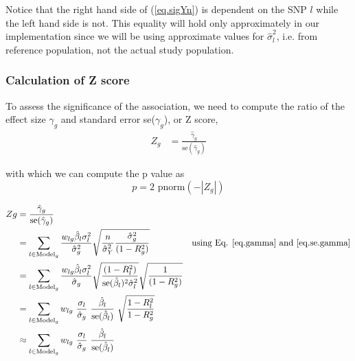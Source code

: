 \documentclass[10pt]{article}
\begin{document}
Notice that the right hand side of (\ref{eq.sigYn}) is dependent on the SNP $l$ while the left hand side is not. This equality will hold only approximately in our implementation since we will be using approximate values for $\hat\sigma_l^2$, i.e. from reference population, not the actual study population.

\subsubsection*{Calculation of Z score}

To assess the significance of the association, we need to compute the ratio of the effect size $\gamma_g$ and standard error se($\gamma_g$), or Z score, 
\begin{align}
Z_g & = \frac{ \hat\gamma_g}{\text{se}(\hat\gamma_g)} 
\end{align}

with which we can compute the  p value as
\begin{equation}
p = 2 \text{ pnorm}(-|Z_g|)
\end{equation}

\begin{align}
Zg 
& = \frac{ \hat\gamma_g}{\text{se}(\hat\gamma_g)} \nonumber 
&\text{}\\
%
& =   \sum_{l\in \text{Model}_g} \frac{w_{lg} \hat\beta_l \sigma^2_l }{ \hat\sigma^2_g}   \sqrt{\frac{n}{\hat\sigma_Y^2 }\frac{\hat\sigma^2_g}{(1-R^2_g)} }  
&\text{using Eq. \ref{eq.gamma} and \ref{eq.se.gamma}} \nonumber \\ 
%
&= \sum_{l\in \text{Model}_g}\frac{  w_{lg} \hat\beta_l \sigma^2_l }{ \hat\sigma_g}  \sqrt{\frac{(1-R^2_l)}{\text{se}(\hat\beta_l)^2 \hat\sigma_l^2}} \sqrt{\frac{1}{(1-R^2_g)} } 
& \text{} \nonumber \\
%
&= \sum_{l\in \text{Model}_g}  w_{lg} ~ \frac{\sigma_l}{\hat\sigma_g} ~ \frac{\hat\beta_l}{\text{se}(\hat\beta_l)} ~ \sqrt{\frac{1-R_l^2}{1-R_g^2}}
& \text{}\\
%
&\approx \sum_{l\in \text{Model}_g}  w_{lg} ~ \frac{\sigma_l}{\hat\sigma_g} ~ \frac{\hat\beta_l}{\text{se}(\hat\beta_l)} 
& \text{}
\end{align}



\end{document}
